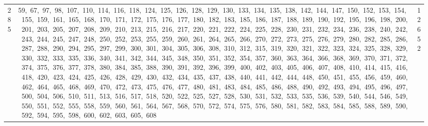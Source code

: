 \begin{longtable}{c|p{}|r}
285 & 59,\ 67,\ 97,\ 98,\ 107,\ 110,\ 114,\ 116,\ 118,\ 124,\ 125,\ 126,\ 128,\ 129,\ 130,\ 133,\ 134,\ 135,\ 138,\ 142,\ 144,\ 147,\ 150,\ 152,\ 153,\ 154,\ 155,\ 159,\ 161,\ 165,\ 168,\ 170,\ 171,\ 172,\ 175,\ 176,\ 177,\ 180,\ 182,\ 183,\ 185,\ 186,\ 187,\ 188,\ 189,\ 190,\ 192,\ 195,\ 196,\ 198,\ 200,\ 201,\ 203,\ 205,\ 207,\ 208,\ 209,\ 210,\ 213,\ 215,\ 216,\ 217,\ 220,\ 221,\ 222,\ 224,\ 225,\ 228,\ 230,\ 231,\ 232,\ 234,\ 236,\ 238,\ 240,\ 242,\ 243,\ 244,\ 245,\ 247,\ 248,\ 250,\ 252,\ 253,\ 255,\ 259,\ 260,\ 261,\ 264,\ 265,\ 266,\ 270,\ 272,\ 273,\ 275,\ 276,\ 279,\ 280,\ 282,\ 285,\ 286,\ 287,\ 288,\ 290,\ 294,\ 295,\ 297,\ 299,\ 300,\ 301,\ 304,\ 305,\ 306,\ 308,\ 310,\ 312,\ 315,\ 319,\ 320,\ 321,\ 322,\ 323,\ 324,\ 325,\ 328,\ 329,\ 330,\ 332,\ 333,\ 335,\ 336,\ 340,\ 341,\ 342,\ 344,\ 345,\ 348,\ 350,\ 351,\ 352,\ 354,\ 357,\ 360,\ 363,\ 364,\ 366,\ 368,\ 369,\ 370,\ 371,\ 372,\ 374,\ 375,\ 376,\ 377,\ 378,\ 380,\ 384,\ 385,\ 388,\ 390,\ 391,\ 392,\ 396,\ 399,\ 400,\ 402,\ 403,\ 405,\ 406,\ 407,\ 408,\ 410,\ 414,\ 415,\ 416,\ 418,\ 420,\ 423,\ 424,\ 425,\ 426,\ 428,\ 429,\ 430,\ 432,\ 434,\ 435,\ 437,\ 438,\ 440,\ 441,\ 442,\ 444,\ 448,\ 450,\ 451,\ 455,\ 456,\ 459,\ 460,\ 462,\ 464,\ 465,\ 468,\ 469,\ 470,\ 472,\ 473,\ 475,\ 476,\ 477,\ 480,\ 481,\ 483,\ 484,\ 485,\ 486,\ 488,\ 490,\ 492,\ 493,\ 494,\ 495,\ 496,\ 497,\ 500,\ 504,\ 506,\ 510,\ 511,\ 513,\ 516,\ 517,\ 518,\ 520,\ 522,\ 525,\ 527,\ 528,\ 530,\ 531,\ 532,\ 533,\ 535,\ 536,\ 539,\ 540,\ 544,\ 546,\ 549,\ 550,\ 551,\ 552,\ 555,\ 558,\ 559,\ 560,\ 561,\ 564,\ 567,\ 568,\ 570,\ 572,\ 574,\ 575,\ 576,\ 580,\ 581,\ 582,\ 583,\ 584,\ 585,\ 588,\ 589,\ 590,\ 592,\ 594,\ 595,\ 598,\ 600,\ 602,\ 603,\ 605,\ 608 & 12652 \\

\end{longtable}
